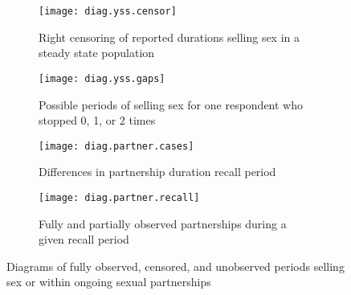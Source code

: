 \begin{figure}
  \begin{subfigure}[b]{\textwidth}
    \centering\texttt{[image: diag.yss.censor]}
    \caption{Right censoring of reported durations selling sex in a steady state population}
    \label{fig:diag.yss.censor}
  \end{subfigure}
  \begin{subfigure}[b]{\textwidth}
    \centering\texttt{[image: diag.yss.gaps]}
    \caption{Possible periods of selling sex for one respondent who stopped 0, 1, or 2 times}
    \label{fig:diag.yss.gaps}
  \end{subfigure}
  \begin{subfigure}[b]{\textwidth}
    \centering\texttt{[image: diag.partner.cases]}
    \caption{Differences in partnership duration \vs recall period}
    \label{fig:diag.partner.cases}
  \end{subfigure}
  \begin{subfigure}[b]{\textwidth}
    \centering\texttt{[image: diag.partner.recall]}
    \caption{Fully and partially observed partnerships during a given recall period}
    \label{fig:diag.partner.recall}
  \end{subfigure}
  \caption{Diagrams of fully observed, censored, and unobserved periods
    selling sex or within ongoing sexual partnerships}
  \label{fig:diag}
\end{figure}